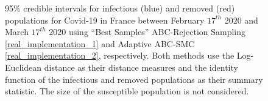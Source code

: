 \documentclass[11pt,a4paper]{article}
\theoremstyle{break}
\begin{document}
  \begin{figure}[H]
    \centering
    \caption{95\% credible intervals for infectious (blue) and removed (red) populations for Covid-19 in France between February $17^{th}$ 2020 and March $17^{th}$ 2020 using ``Best Samples'' ABC-Rejection Sampling \ref{real_implementation_1} and Adaptive ABC-SMC \ref{real_implementation_2}, respectively. Both methods use the Log-Euclidean distance as their distance measures and the identity function of the infectious and removed populations as their summary statistic. The size of the susceptible population is not considered.}
    \label{fig_france_identity_ci}
  \end{figure}
\end{document}
